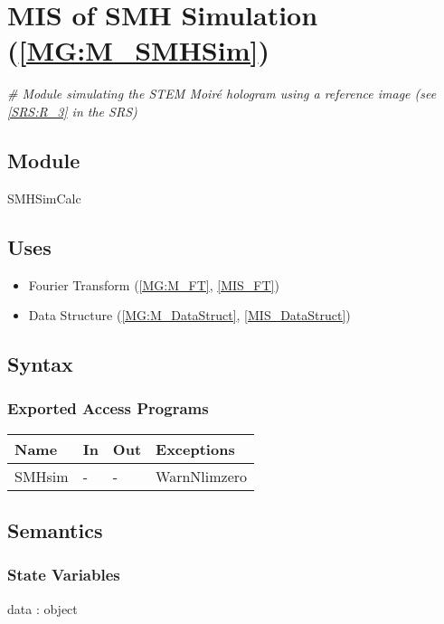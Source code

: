 \documentclass[12pt, titlepage]{article}
\begin{document}
\section{MIS of SMH Simulation (\texorpdfstring{\cref{MG:M_SMHSim}}))} 
\label{MIS_SMHSim}

\noindent\textit{{\#} Module simulating the STEM Moir{\'e} hologram using a 
reference image (see \cref{SRS:R_3} in the SRS)}

\subsection{Module}
SMHSimCalc
\subsection{Uses}
\begin{itemize}
\item Fourier Transform (\cref{MG:M_FT}, \cref{MIS_FT})
\item Data Structure (\cref{MG:M_DataStruct}, \cref{MIS_DataStruct})
\end{itemize}

\subsection{Syntax}

\subsubsection{Exported Access Programs}

\begin{center}
\begin{tabular}{p{2cm} p{4cm} p{4cm} p{2cm}}
\hline
\textbf{Name} & \textbf{In} & \textbf{Out} & \textbf{Exceptions} \\
\hline
SMHsim & - & - & WarnNlimzero\\
\hline
\end{tabular}
\end{center}

\subsection{Semantics}

\subsubsection{State Variables}

data : object
\end{document}

